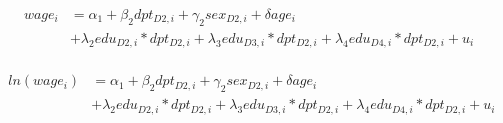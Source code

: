 \documentclass[12pt,(landscape,a4paper),(portrait,a4paper)]{article}
\theoremstyle{definition}
\theoremstyle{definition}
\theoremstyle{definition}
\theoremstyle{remark}
\begin{document}
\begin{align}
\begin{split}
wage_i & =\alpha_1+\beta_2 dpt_{D2,i}+\gamma_2sex_{D2,i} +\delta age_i \\
& +\lambda_2edu_{D2,i} \ast dpt_{D2,i}+\lambda_3edu_{D3,i}\ast dpt_{D2,i}+\lambda_4edu_{D4,i}\ast dpt_{D2,i} +u_i 
\end{split}
\label{eq:both-prod-part} 
\end{align}

\begin{align}
\begin{split}
ln(wage_i) & =\alpha_1+\beta_2 dpt_{D2,i}+\gamma_2sex_{D2,i} +\delta age_i \\
& +\lambda_2edu_{D2,i} \ast dpt_{D2,i}+\lambda_3edu_{D3,i}\ast dpt_{D2,i} +\lambda_4edu_{D4,i}\ast dpt_{D2,i}+u_i 
\end{split}
\label{eq:both-prod-log-part} 
\end{align}
\end{document}
